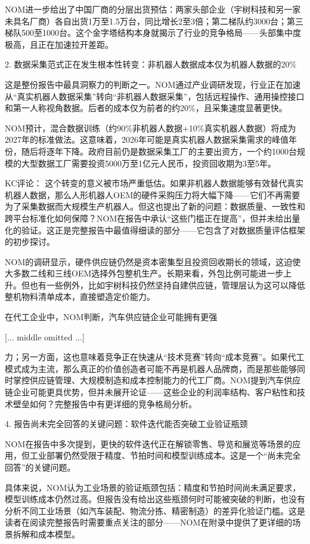 \documentclass[11pt]{ctexart}
\begin{document}
NOM进一步给出了中国厂商的分层出货预估：两家头部企业（宇树科技和另一家未具名厂商）各自出货1万至1.5万台，同比增长2至3倍；第二梯队约3000台；第三梯队500至1000台。这个金字塔结构本身就揭示了行业的竞争格局——头部集中度极高，且正在加速拉开差距。

2. 数据采集范式正在发生根本性转变：非机器人数据成本仅为机器人数据的20\%

这是整份报告中最具洞察力的判断之一。NOM通过产业调研发现，行业正在加速从“真实机器人数据采集”转向“非机器人数据采集”，包括远程操作、通用操控接口和第一人称视角数据。后者的成本仅为前者的约20\%，且采集速度显著更快。

NOM预计，混合数据训练（约90\%非机器人数据+10\%真实机器人数据）将成为2027年的标准做法。这意味着，2026年可能是真实机器人数据采集需求的峰值年份，随后将逐年下降。政府目前仍是数据采集工厂的主要出资方，一个约1000台规模的大型数据工厂需要投资5000万至1亿元人民币，投资回收期为3至5年。

KC评论： 这个转变的意义被市场严重低估。如果非机器人数据能够有效替代真实机器人数据，那么人形机器人OEM的硬件采购压力将大幅下降——它们不再需要为了采集数据而大规模生产机器人。但这也提出了新的问题：数据质量、一致性和跨平台标准化如何保障？NOM在报告中承认“这些门槛正在提高”，但并未给出量化的验证。这正是完整报告中最值得细读的部分——它包含了对数据质量评估框架的初步探讨。

NOM的调研显示，硬件供应链仍然是资本密集型且投资回收期长的领域，这迫使大多数二线和三线OEM选择外包整机生产。长期来看，外包比例可能进一步上升。但也有一些例外，比如宇树科技仍然坚持自建供应链，管理层认为这可以降低整机物料清单成本，直接塑造定价能力。

在代工企业中，NOM判断，汽车供应链企业可能拥有更强

[... middle omitted ...]

力；另一方面，这也意味着竞争正在快速从“技术竞赛”转向“成本竞赛”。如果代工模式成为主流，那么真正的价值创造者可能不再是机器人品牌商，而是那些能够同时掌控供应链管理、大规模制造和成本控制能力的代工厂商。NOM提到汽车供应链企业可能更具优势，但并未展开论证——这些企业的利润率结构、客户粘性和技术壁垒如何？完整报告中有更详细的竞争格局分析。

4. 报告尚未完全回答的关键问题：软件迭代能否突破工业验证瓶颈

NOM在报告中多次提到，更快的软件迭代正在解锁零售、导览和展览等场景的应用，但工业部署仍然受限于精度、节拍时间和模型训练成本。这是一个“尚未完全回答”的关键问题。

具体来说，NOM认为工业场景的验证瓶颈包括：精度和节拍时间尚未满足要求，模型训练成本仍然过高。但报告没有给出这些瓶颈何时可能被突破的判断，也没有分析不同工业场景（如汽车装配、物流分拣、精密制造）的差异化验证门槛。这是读者在阅读完整报告时需要重点关注的部分——NOM在附录中提供了更详细的场景拆解和成本模型。
\end{document}

